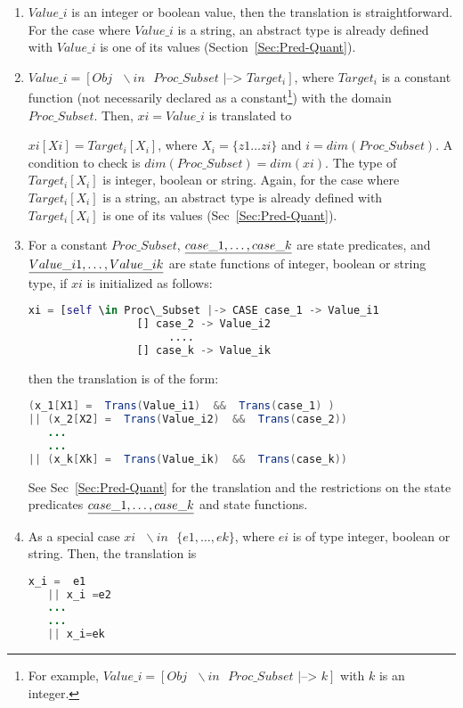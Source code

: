 \documentclass{article}
\theoremstyle{plain}
\numberwithin{equation}{section}
\begin{document}
\begin{enumerate}
\item  \emph{$Value\_i$} is an integer or boolean value, then the translation is straightforward. For  the case where \emph{$Value\_i$} is a string, an abstract type is already defined with  \emph{$Value\_i$} is  one of its values (Section~\ref{Sec:Pred-Quant}). 
\item  \color{blue} $Value\_i= [Obj \text{  }\backslash in \text{  }  Proc\_Subset \text{  |--> } Target_i]$, where  $Target_i$ is a constant function (not necessarily declared as a constant\footnote{For example, $Value\_i= [Obj \text{  }\backslash in \text{  }  Proc\_Subset \text{  |--> } k]$ with $k$ is an integer.}) with the domain $Proc\_Subset$. Then, $xi=Value\_i$  is translated to 

$xi[Xi]=Target_i[X_i]$, where $X_i = \{z1 \dots zi\} $ and $i=dim(Proc\_Subset)$. A condition to check is $dim(Proc\_Subset)=dim(xi)$. The type of $Target_i[X_i]$ is integer, boolean or string. Again, for the case where $Target_i[X_i]$ is a string, an abstract type is already defined with $Target_i[X_i]$ is  one of its values (Sec~\ref{Sec:Pred-Quant}).\color{black} 


\item For a constant $Proc\_Subset$,  $\emph{case\_1, \dots, case\_k}$ are state predicates, and $\emph{Value\_i1, \dots, Value\_ik}$ are state functions of integer, boolean or string type,  if $xi$ is initialized as follows: 
\begin{lstlisting}[language=Python]
xi = [self \in Proc\_Subset |-> CASE case_1 -> Value_i1
                 [] case_2 -> Value_i2
                      ....
                 [] case_k -> Value_ik
\end{lstlisting} 
then the translation is of the form:

\begin{lstlisting}[language=java ]
(x_1[X1] =  Trans(Value_i1)  &&  Trans(case_1) )
|| (x_2[X2] =  Trans(Value_i2)  &&  Trans(case_2))    
   ...
   ...  
|| (x_k[Xk] =  Trans(Value_ik)  &&  Trans(case_k)) 
\end{lstlisting}
See Sec~\ref{Sec:Pred-Quant} for the translation  and the restrictions on the  state predicates $\emph{case\_1, \dots, case\_k}$ and state functions.

\item As a special case $xi  \text{ }\backslash in \text{ } \{e1, \dots, ek\}$, where $ei$ is of type integer, boolean or string. Then,  the translation is 
\begin{lstlisting}[language=java]
   x_i =  e1   
   || x_i =e2    
   ...
   ...  
   || x_i=ek  
\end{lstlisting}





\end{enumerate}
\end{document}
